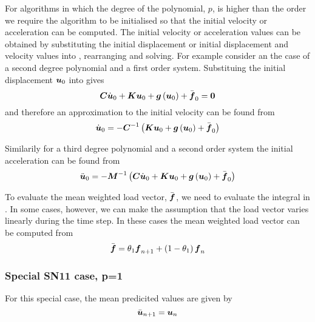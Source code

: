 For algorithms in which the degree of the polynomial, $p$, is higher than the
order we require the algorithm to be initialised so that the initial velocity
or acceleration can be computed. The initial velocity or acceleration values
can be obtained by substituting the initial displacement or initial
displacement and velocity values into ,
rearranging and solving. For example consider an the case of a second degree
polynomial and a first order system. Substituing the initial displacement
$\vect{u}_{0}$ into  gives
\begin{equation}
  \matr{C}\dot{\vect{u}}_{0}+\matr{K}\vect{u}_{0}+\fnof{\vect{g}}{\vect{u}_{0}}+\bar{\vect{f}}_{0}=\vect{0}
\end{equation}
and therefore an approximation to the initial velocity can be found from
\begin{equation}
  \dot{\vect{u}}_{0}=-\inverse{\matr{C}}\pbrac{\matr{K}\vect{u}_{0}+\fnof{\vect{g}}{\vect{u}_{0}}+\bar{\vect{f}}_{0}}
\end{equation}

Similarily for a third degree polynomial and a second order system the initial
acceleration can be found from
\begin{equation}
  \ddot{\vect{u}}_{0}=-\inverse{\matr{M}}\pbrac{\matr{C}\dot{\vect{u}}_{0}+\matr{K}\vect{u}_{0}+
    \fnof{\vect{g}}{\vect{u}_{0}}+\bar{\vect{f}}_{0}}
\end{equation}

To evaluate the mean weighted load vector, $\bar{\vect{f}}$, we need to
evaluate the integral in . In some cases,
however, we can make the assumption that the load vector varies linearly
during the time step. In these cases the mean weighted load vector can be
computed from
\begin{equation}
  \bar{\vect{f}}=\theta_{1}\vect{f}_{n+1}+\pbrac{1-\theta_{1}}\vect{f}_{n}
\end{equation}

\subsubsection{Special SN11 case, p=1}

For this special case, the mean predicited values are given by
\begin{equation}
   \bar{\vect{u}}_{n+1} = \vect{u}_{n}
\end{equation}

